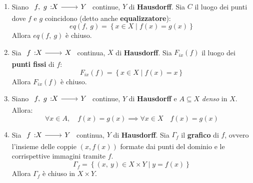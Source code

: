 \begin{proposition}~{}
\begin{enumerate}
\item Siano $\funz{f,\ g}{X}{Y}$ continue, $Y$ di \textbf{Hausdorff}. Sia $C$ il luogo dei punti dove $f$ e $g$ coincidono (detto anche \textbf{equalizzatore}):
\begin{equation}
eq\left(f,\ g\right)=\left\{x\in X\mid f\left(x\right)=g\left(x\right)\right\}
\end{equation}
Allora $eq\left(f,\ g\right)$ è chiuso.
\item  Sia $\funz{f}{X}{X}$ continua, $X$ di \textbf{Hausdorff}.  Sia $F_{ix}\left(f\right)$ il luogo dei \textbf{punti fissi} di $f$:
\begin{equation}
F_{ix}\left(f\right)=\left\{x\in X\mid f\left(x\right)=x\right\}
\end{equation}
Allora $F_{ix}\left(f\right)$ è chiuso.
\item Siano $\funz{f,\ g}{X}{Y}$ continue, $Y$ di \textbf{Hausdorff} e $A\subseteq X$ \textit{denso} in $X$. Allora:
\begin{equation}
\forall x\in A,\quad f\left(x\right)=g\left(x\right)\implies \forall x\in X\quad f\left(x\right)=g\left(x\right)
\end{equation}
\item Sia $\funz{f}{X}{Y}$ continua, $Y$ di \textbf{Hausdorff}. Sia $\Gamma_f$ il \textbf{grafico} di $f$, ovvero l'insieme delle coppie $(x,f\left(x\right))$ formate dai punti del dominio e le corrispettive immagini tramite $f$.
\begin{equation}
\Gamma_f=\left\{\left(x,\ y\right)\in X\times Y\mid y=f\left(x\right)\right\}
\end{equation}
Allora $\Gamma_f$ è chiuso in $X\times Y$.
\end{enumerate}
\vspace{-3mm}
\end{proposition}
